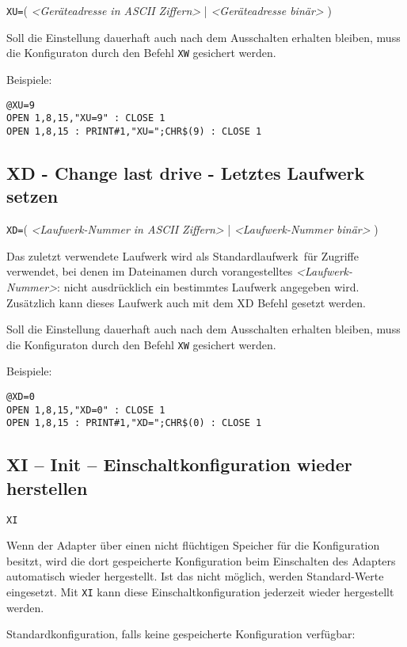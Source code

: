 \documentclass[10pt,a4paper]{scrartcl}		%
\begin{document}
\texttt{XU=}\Big( \textit{<Geräteadresse in ASCII Ziffern>} \Big|
\textit{<Geräteadresse binär>} \Big)

Soll die Einstellung dauerhaft auch nach dem Ausschalten erhalten 
bleiben, muss die Konfiguraton durch den Befehl \texttt{XW} gesichert werden.

Beispiele:

\begin{verbatim}
@XU=9
OPEN 1,8,15,"XU=9" : CLOSE 1
OPEN 1,8,15 : PRINT#1,"XU=";CHR$(9) : CLOSE 1
\end{verbatim}

\subsection{XD - Change last drive - Letztes Laufwerk setzen}

\texttt{XD=}\Big( \textit{<Laufwerk-Nummer in ASCII Ziffern>} \Big|
\textit{<Laufwerk-Nummer binär>} \Big)

Das zuletzt verwendete Laufwerk wird als \glqq Standardlaufwerk\grqq\  für
Zugriffe verwendet, bei denen im Dateinamen durch vorangestelltes
\textit{<Laufwerk-Nummer>}: nicht ausdrücklich ein bestimmtes
Laufwerk angegeben wird.  
Zusätzlich kann dieses Laufwerk auch mit dem XD Befehl gesetzt werden.

Soll die Einstellung dauerhaft auch nach dem Ausschalten erhalten 
bleiben, muss die Konfiguraton durch den Befehl \texttt{XW} gesichert werden.

Beispiele:

\begin{verbatim}
@XD=0
OPEN 1,8,15,"XD=0" : CLOSE 1
OPEN 1,8,15 : PRINT#1,"XD=";CHR$(0) : CLOSE 1
\end{verbatim}

\subsection{XI -- Init -- Einschaltkonfiguration wieder herstellen}

\texttt{XI}

Wenn der Adapter über einen nicht flüchtigen Speicher für die
Konfiguration besitzt, wird die dort gespeicherte Konfiguration beim
Einschalten des Adapters automatisch wieder hergestellt. 
Ist das nicht möglich, werden Standard-Werte eingesetzt.
Mit \texttt{XI} kann diese Einschaltkonfiguration jederzeit wieder
hergestellt werden.

Standardkonfiguration, falls keine gespeicherte Konfiguration verfügbar:
\end{document}
